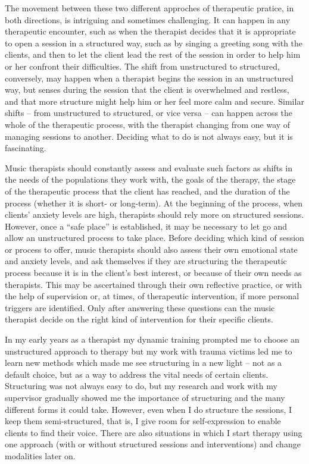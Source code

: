 \documentclass[authordate, empirical, issue]{jote-new-article}
\begin{document}
The movement between these two different approches of therapeutic pratice, in both directions, is intriguing and sometimes challenging. It can happen in any therapeutic encounter, such as when the therapist decides that it is appropriate to open a session in a structured way, such as by singing a greeting song with the clients, and then to let the client lead the rest of the session in order to help him or her confront their difficulties. The shift from unstructured to structured, conversely, may happen when a therapist begins the session in an unstructured way, but senses during the session that the client is overwhelmed and restless, and that more structure might help him or her feel more calm and secure. Similar shifts -- from unstructured to structured, or vice versa -- can happen across the whole of the therapeutic process, with the therapist changing from one way of managing sessions to another. Deciding what to do is not always easy, but it is fascinating.



Music therapists should constantly assess and evaluate such factors as shifts in the needs of the populations they work with, the goals of the therapy, the stage of the therapeutic process that the client has reached, and the duration of the process (whether it is short- or long-term). At the beginning of the process, when clients' anxiety levels are high, therapists should rely more on structured sessions. However, once a “safe place” is established, it may be necessary to let go and allow an unstructured process to take place. Before deciding which kind of session or process to offer, music therapists should also assess their own emotional state and anxiety levels, and ask themselves if they are structuring the therapeutic process because it is in the client's best interest, or because of their own needs as therapists. This may be ascertained through their own reflective practice, or with the help of supervision or, at times, of therapeutic intervention, if more personal triggers are identified. Only after answering these questions can the music therapist decide on the right kind of intervention for their specific clients.



In my early years as a therapist my dynamic training prompted me to choose an unstructured approach to therapy but my work with trauma victims led me to learn new methods which made me see structuring in a new light -- not as a default choice, but as a way to address the vital needs of certain clients. Structuring was not always easy to do, but my research and work with my supervisor gradually showed me the importance of structuring and the many different forms it could take. However, even when I do structure the sessions, I keep them semi-structured, that is, I give room for self-expression to enable clients to find their voice. There are also situations in which I start therapy using one approach (with or without structured sessions and interventions) and change modalities later on.
\end{document}
